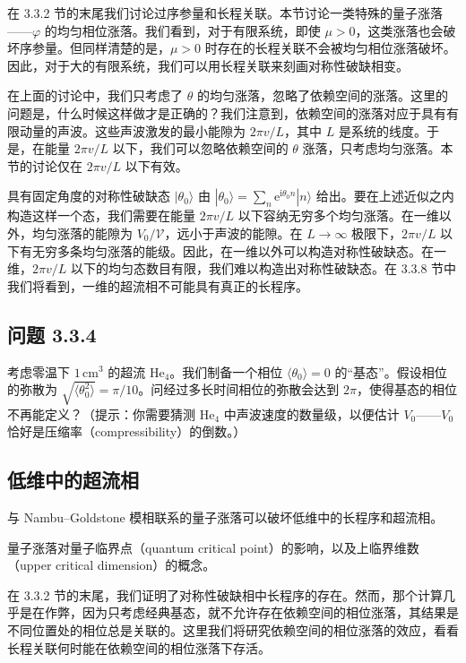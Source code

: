 在 3.3.2 节的末尾我们讨论过序参量和长程关联。本节讨论一类特殊的量子涨落——$\varphi$ 的均匀相位涨落。我们看到，对于有限系统，即使 $\mu>0$，这类涨落也会破坏序参量。但同样清楚的是，$\mu>0$ 时存在的长程关联不会被均匀相位涨落破坏。因此，对于大的有限系统，我们可以用长程关联来刻画对称性破缺相变。

在上面的讨论中，我们只考虑了 $\theta$ 的均匀涨落，忽略了依赖空间的涨落。这里的问题是，什么时候这样做才是正确的？我们注意到，依赖空间的涨落对应于具有有限动量的声波。这些声波激发的最小能隙为 $2\pi v/L$，其中 $L$ 是系统的线度。于是，在能量 $2\pi v/L$ 以下，我们可以忽略依赖空间的 $\theta$ 涨落，只考虑均匀涨落。本节的讨论仅在 $2\pi v/L$ 以下有效。

具有固定角度的对称性破缺态 $|\theta_0\rangle$ 由 $|\theta_0\rangle=\sum_n\mathrm{e}^{\mathrm{i}\theta_0 n}|n\rangle$ 给出。要在上述近似之内构造这样一个态，我们需要在能量 $2\pi v/L$ 以下容纳无穷多个均匀涨落。在一维以外，均匀涨落的能隙为 $V_0/\mathcal{V}$，远小于声波的能隙。在 $L\to\infty$ 极限下，$2\pi v/L$ 以下有无穷多条均匀涨落的能级。因此，在一维以外可以构造对称性破缺态。在一维，$2\pi v/L$ 以下的均匀态数目有限，我们难以构造出对称性破缺态。在 3.3.8 节中我们将看到，一维的超流相不可能具有真正的长程序。

\subsection*{问题 3.3.4}

考虑零温下 $1\,\mathrm{cm}^3$ 的超流 $\mathrm{He}_4$。我们制备一个相位 $\langle\theta_0\rangle=0$ 的“基态”。假设相位的弥散为 $\sqrt{\langle\theta_0^2\rangle}=\pi/10$。问经过多长时间相位的弥散会达到 $2\pi$，使得基态的相位不再能定义？（提示：你需要猜测 $\mathrm{He}_4$ 中声波速度的数量级，以便估计 $V_0$——$V_0$ 恰好是压缩率（compressibility）的倒数。）

\subsection{低维中的超流相}

\begin{keypoints}
\item 与 Nambu--Goldstone 模相联系的量子涨落可以破坏低维中的长程序和超流相。
\item 量子涨落对量子临界点（quantum critical point）的影响，以及上临界维数（upper critical dimension）的概念。
\end{keypoints}

在 3.3.2 节的末尾，我们证明了对称性破缺相中长程序的存在。然而，那个计算几乎是在作弊，因为只考虑经典基态，就不允许存在依赖空间的相位涨落，其结果是不同位置处的相位总是关联的。这里我们将研究依赖空间的相位涨落的效应，看看长程关联何时能在依赖空间的相位涨落下存活。

